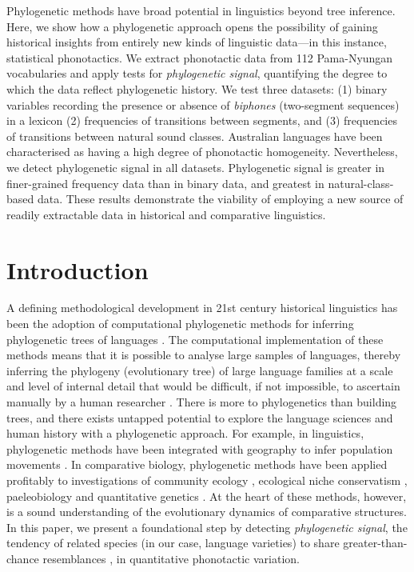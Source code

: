 Phylogenetic methods have broad potential in linguistics beyond tree inference. Here, we show how a phylogenetic approach opens the possibility of gaining historical insights from entirely new kinds of linguistic data---in this instance, statistical phonotactics. We extract phonotactic data from 112 Pama-Nyungan vocabularies and apply tests for \emph{phylogenetic signal}, quantifying the degree to which the data reflect phylogenetic history. We test three datasets: (1) binary variables recording the presence or absence of \emph{biphones} (two-segment sequences) in a lexicon (2) frequencies of transitions between segments, and (3) frequencies of transitions between natural sound classes. Australian languages have been characterised as having a high degree of phonotactic homogeneity. Nevertheless, we detect phylogenetic signal in all datasets. Phylogenetic signal is greater in finer-grained frequency data than in binary data, and greatest in natural-class-based data. These results demonstrate the viability of employing a new source of readily extractable data in historical and comparative linguistics.

\hypertarget{phy-sig-intro}{%
\section{Introduction}\label{phy-sig-intro}}

A defining methodological development in 21st century historical linguistics has been the adoption of computational phylogenetic methods for inferring phylogenetic trees of languages \autocites{steiner_pipeline_2011}{bowern_computational_2018}{jager_computational_2019}. The computational implementation of these methods means that it is possible to analyse large samples of languages, thereby inferring the phylogeny (evolutionary tree) of large language families at a scale and level of internal detail that would be difficult, if not impossible, to ascertain manually by a human researcher \autocite[p.~827]{bowern_computational_2012}. There is more to phylogenetics than building trees, and there exists untapped potential to explore the language sciences and human history with a phylogenetic approach. For example, in linguistics, phylogenetic methods have been integrated with geography to infer population movements \autocites{walker_bayesian_2011}{bouckaert_origin_2018}. In comparative biology, phylogenetic methods have been applied profitably to investigations of community ecology \autocite{webb_phylogenies_2002}, ecological niche conservatism \autocite{losos_phylogenetic_2008}, paeleobiology \autocite{sallan_heads_2012} and quantitative genetics \autocite{de_villemereuil_general_2014}. At the heart of these methods, however, is a sound understanding of the evolutionary dynamics of comparative structures. In this paper, we present a foundational step by detecting \emph{phylogenetic signal}, the tendency of related species (in our case, language varieties) to share greater-than-chance resemblances \autocite{blomberg_tempo_2002}, in quantitative phonotactic variation.

